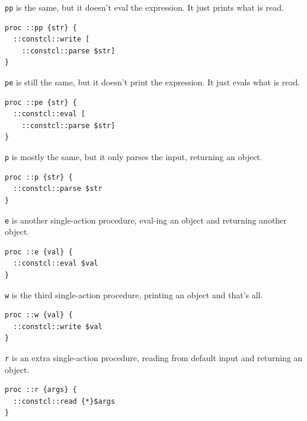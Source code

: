 \documentclass[twoside,9pt]{report}
\begin{document}
\texttt{pp} is the same, but it doesn't eval the expression. It just prints what is read.

\noindent\makebox[\linewidth]{\rule{\linewidth}{0.4pt}}
\begin{lstlisting}
proc ::pp {str} {
  ::constcl::write [
    ::constcl::parse $str]
}
\end{lstlisting}
\noindent\makebox[\linewidth]{\rule{\linewidth}{0.4pt}}

\texttt{pe} is still the same, but it doesn't print the expression. It just evals what is read.

\noindent\makebox[\linewidth]{\rule{\linewidth}{0.4pt}}
\begin{lstlisting}
proc ::pe {str} {
  ::constcl::eval [
    ::constcl::parse $str]
}
\end{lstlisting}
\noindent\makebox[\linewidth]{\rule{\linewidth}{0.4pt}}

\texttt{p} is mostly the same, but it only parses the input, returning an object.

\noindent\makebox[\linewidth]{\rule{\linewidth}{0.4pt}}
\begin{lstlisting}
proc ::p {str} {
  ::constcl::parse $str
}
\end{lstlisting}
\noindent\makebox[\linewidth]{\rule{\linewidth}{0.4pt}}

\texttt{e} is another single-action procedure, eval-ing an object and returning another object.

\noindent\makebox[\linewidth]{\rule{\linewidth}{0.4pt}}
\begin{lstlisting}
proc ::e {val} {
  ::constcl::eval $val
}
\end{lstlisting}
\noindent\makebox[\linewidth]{\rule{\linewidth}{0.4pt}}

\texttt{w} is the third single-action procedure, printing an object and that's all.

\noindent\makebox[\linewidth]{\rule{\linewidth}{0.4pt}}
\begin{lstlisting}
proc ::w {val} {
  ::constcl::write $val
}
\end{lstlisting}
\noindent\makebox[\linewidth]{\rule{\linewidth}{0.4pt}}

\texttt{r} is an extra single-action procedure, reading from default input and returning an object.

\noindent\makebox[\linewidth]{\rule{\linewidth}{0.4pt}}
\begin{lstlisting}
proc ::r {args} {
  ::constcl::read {*}$args
}
\end{lstlisting}
\noindent\makebox[\linewidth]{\rule{\linewidth}{0.4pt}}
\end{document}
